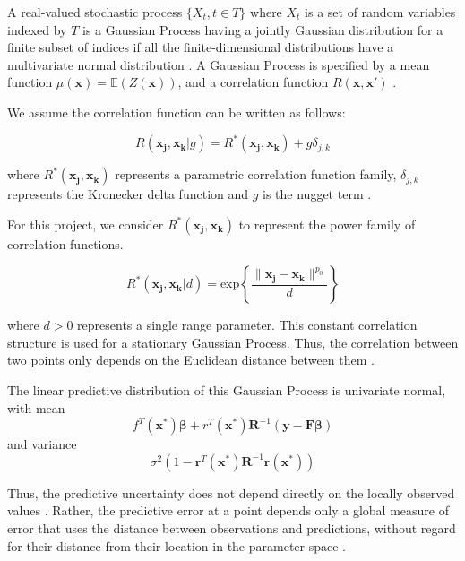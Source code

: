 \documentclass{article}\usepackage[]{graphicx}\usepackage[]{color}
\begin{document}
A real-valued stochastic process $\{ X_t, t \in T \}$ where $X_t$ is a set of random variables indexed by $T$ is a Gaussian Process having a jointly Gaussian distribution for a finite subset of indices if all the finite-dimensional distributions have a multivariate normal distribution \cite{gramacy_lee_2008}. A Gaussian Process is specified by a mean function $\mu(\textbf{x}) = \mathbb{E}(Z(\textbf{x}))$, and a correlation function $R(\textbf{x}, \textbf{x}')$ \cite{gramacy_lee_2008}.

We assume the correlation function can be written as follows:

\begin{equation}
R(\boldsymbol{x_j},\boldsymbol{x_k}|g) = R^{*}(\boldsymbol{x_j},\boldsymbol{x_k}) +g \delta_{j,k}
\end{equation}

where $R^{*}(\boldsymbol{x_j},\boldsymbol{x_k})$ represents a parametric correlation function family, $\delta_{j,k}$ represents the Kronecker delta function and $g$ is the nugget term \cite{gramacy_lee_2008}.

For this project, we consider $R^{*}(\boldsymbol{x_j},\boldsymbol{x_k})$ to represent the power family of correlation functions.

\begin{equation}
\label{eq:1}
R^{*}(\boldsymbol{x_j},\boldsymbol{x_k}|d) = \text{exp} \left\{ \frac{\lVert \boldsymbol{x_j} - \boldsymbol{x_k}\rVert^{p_0}}{d} \right\}
\end{equation}

where $d > 0$ represents a single range parameter. This constant correlation structure is used for a stationary Gaussian Process. Thus, the correlation between two points only depends on the Euclidean distance between them \cite{gramacy_lee_2008}.

The linear predictive distribution of this Gaussian Process is univariate normal, with mean 
\begin{equation}
\label{eq:12}
f^{T}(\boldsymbol{x}^{*})\boldsymbol{\beta} + r^{T}(\boldsymbol{x}^{*})\boldsymbol{R}^{-1}(\boldsymbol{y}-\boldsymbol{F}\boldsymbol{\beta})
\end{equation}
and variance 
\begin{equation}
\sigma^2(1-\boldsymbol{r}^T(\boldsymbol{x}^{*})\boldsymbol{R}^{-1}\boldsymbol{r}(\boldsymbol{x}^{*}))
\end{equation}

Thus, the predictive uncertainty does not depend directly on the locally observed values \cite{gramacy_lee_2008}. Rather, the predictive error at a point depends only a global measure of error that uses the distance between observations and predictions, without regard for their distance from their location in the parameter space \cite{gramacy_lee_2008}. 
\end{document}
